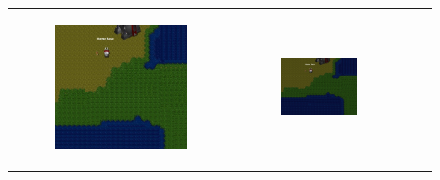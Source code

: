 \documentclass[11pt,letterpaper]{article}
\begin{document}
\begin{figure}
{\begin{tabular}{cccc}
\begin{subfigure}[b]{0.18\textwidth}\includegraphics[width=\textwidth]{figures/bottleneck-1.jpg}\caption{}\label{fig:bottleneck-a}\end{subfigure}&
\begin{subfigure}[b]{0.18\textwidth}\includegraphics[width=\textwidth]{figures/bottleneck-2.jpg}\caption{}\label{fig:bottleneck-b}\end{subfigure}\\

\end{tabular}}
\end{figure}
\end{document}
